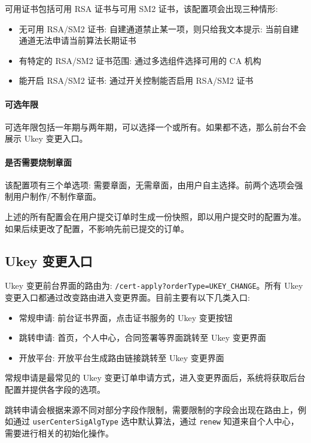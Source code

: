 可用证书包括可用 RSA 证书与可用 SM2 证书，该配置项会出现三种情形:
\begin{itemize}
    \item 无可用 RSA/SM2 证书: 自建通道禁止某一项，则只给我文本提示: 当前自建通道无法申请当前算法长期证书
    \item 有特定的 RSA/SM2 证书范围: 通过多选组件选择可用的 CA 机构
    \item 能开启 RSA/SM2 证书: 通过开关控制能否启用 RSA/SM2 证书
\end{itemize}

\paragraph*{可选年限}

可选年限包括一年期与两年期，可以选择一个或所有。如果都不选，那么前台不会展示 Ukey 变更入口。

\paragraph*{是否需要烧制章面}

该配置项有三个单选项: 需要章面，无需章面，由用户自主选择。前两个选项会强制用户制作/不制作章面。

上述的所有配置会在用户提交订单时生成一份快照，即以用户提交时的配置为准。如果后续更改了配置，不影响先前已提交的订单。

\subsection{Ukey 变更入口}

Ukey 变更前台界面的路由为: \texttt{/cert-apply?orderType=UKEY\_CHANGE}。所有 Ukey 变更入口都通过改变路由进入变更界面。目前主要有以下几类入口:
\begin{itemize}
    \item 常规申请: 前台证书界面，点击证书服务的 Ukey 变更按钮
    \item 跳转申请: 首页，个人中心，合同签署等界面跳转至 Ukey 变更界面
    \item 开放平台: 开放平台生成路由链接跳转至 Ukey 变更界面
\end{itemize}

常规申请是最常见的 Ukey 变更订单申请方式，进入变更界面后，系统将获取后台配置并提供各字段的选项。

跳转申请会根据来源不同对部分字段作限制，需要限制的字段会出现在路由上，例如通过 \texttt{userCenterSigAlgType} 选中默认算法，通过 \texttt{renew} 知道来自个人中心，需要进行相关的初始化操作。

